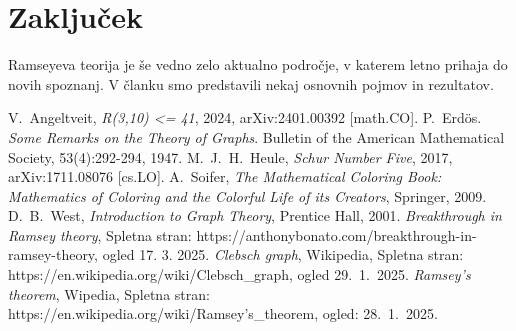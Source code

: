 \documentclass[twoside,11pt]{article}
\begin{document}
\section{Zaključek}
\hspace{\parindent}Ramseyeva teorija je še vedno zelo aktualno področje, v 
katerem letno prihaja do novih spoznanj. 
V članku smo predstavili nekaj osnovnih pojmov in rezultatov.

\begin{thebibliography}{99}
     V.~Angeltveit, \emph{R(3,10) <= 41}, 2024, arXiv:2401.00392 [math.CO].
     P.~Erdös. \emph{Some Remarks on the Theory of Graphs}. Bulletin of the
    American Mathematical Society, 53(4):292-294, 1947.
     M.~J.~H.~Heule, \emph{Schur Number Five}, 2017, arXiv:1711.08076 [cs.LO].
     A.~Soifer, \emph{The Mathematical Coloring Book: Mathematics of Coloring and the Colorful Life of its Creators},
    Springer, 2009.
     D.~B.~West, \emph{Introduction to Graph Theory}, Prentice Hall, 2001.
     \emph{Breakthrough in Ramsey theory}, Spletna stran: https://anthonybonato.com/breakthrough-in-ramsey-theory, ogled 17. 3. 2025.
     \emph{Clebsch graph}, Wikipedia, Spletna stran: https://en.wikipedia.org/wiki/Clebsch\_graph, ogled 29.~1.~2025.
     \emph{Ramsey's theorem}, Wipedia, Spletna stran: https://en.wikipedia.org/wiki/Ramsey's\_theorem, ogled: 28.~1.~2025.
\end{thebibliography}
\end{document}
